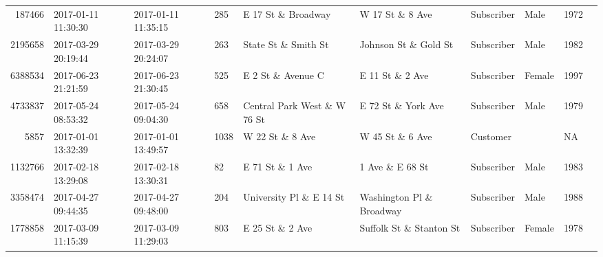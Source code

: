 \documentclass[11pt]{article}
\begin{document}
\begin{description}
\begin{tabular}{r|lllllllll}
	  187466                          & 2017-01-11 11:30:30              & 2017-01-11 11:35:15              &  285                             & E 17 St \& Broadway             & W 17 St \& 8 Ave                & Subscriber                       & Male                             & 1972                            \\
	 2195658                          & 2017-03-29 20:19:44              & 2017-03-29 20:24:07              &  263                             & State St \& Smith St            & Johnson St \& Gold St           & Subscriber                       & Male                             & 1982                            \\
	 6388534                          & 2017-06-23 21:21:59              & 2017-06-23 21:30:45              &  525                             & E 2 St \& Avenue C              & E 11 St \& 2 Ave                & Subscriber                       & Female                           & 1997                            \\
	 4733837                          & 2017-05-24 08:53:32              & 2017-05-24 09:04:30              &  658                             & Central Park West \& W 76 St    & E 72 St \& York Ave             & Subscriber                       & Male                             & 1979                            \\
	    5857                          & 2017-01-01 13:32:39              & 2017-01-01 13:49:57              & 1038                             & W 22 St \& 8 Ave                & W 45 St \& 6 Ave                & Customer                         &                                  &   NA                            \\
	 1132766                          & 2017-02-18 13:29:08              & 2017-02-18 13:30:31              &   82                             & E 71 St \& 1 Ave                & 1 Ave \& E 68 St                & Subscriber                       & Male                             & 1983                            \\
	 3358474                          & 2017-04-27 09:44:35              & 2017-04-27 09:48:00              &  204                             & University Pl \& E 14 St        & Washington Pl \& Broadway       & Subscriber                       & Male                             & 1988                            \\
	 1778858                          & 2017-03-09 11:15:39              & 2017-03-09 11:29:03              &  803                             & E 25 St \& 2 Ave                & Suffolk St \& Stanton St        & Subscriber                       & Female                           & 1978                            \\

\end{tabular}
\end{description}
\end{document}
